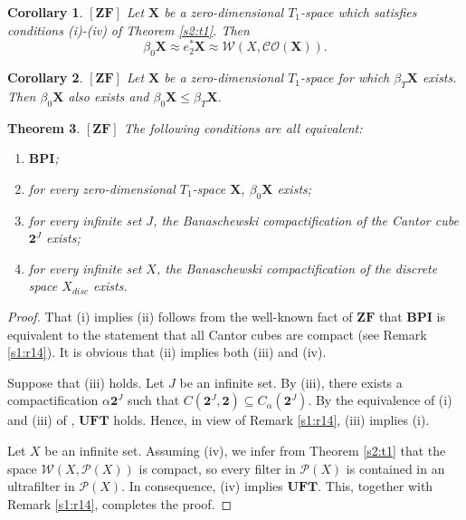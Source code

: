 \documentclass[12pt,twoside,leqno]{article}
\theoremstyle{plain}
\newtheorem{theorem}{Theorem}[section]
\newtheorem{corollary}[theorem]{Corollary}
\theoremstyle{definition}
\theoremstyle{remark}
\begin{document}
\begin{corollary}
	\label{s2:c2}
	$[\mathbf{ZF}]$ Let $\mathbf{X}$ be a zero-dimensional $T_1$-space which satisfies conditions (i)-(iv) of Theorem \ref{s2:t1}. Then
	$$\beta_0\mathbf{X}\approx e^{\ast}_{2}\mathbf{X}\approx\mathcal{W}(X, \mathcal{CO}(\mathbf{X})).$$
\end{corollary}

\begin{corollary}
	\label{s2:c3}
	$[\mathbf{ZF}]$ Let $\mathbf{X}$ be a zero-dimensional $T_1$-space for which $\beta_T\mathbf{X}$ exists. Then $\beta_0\mathbf{X}$ also exists and $\beta_0\mathbf{X}\leq\beta_{T}\mathbf{X}$.
\end{corollary}

\begin{theorem}
	\label{s2:t4}
	$[\mathbf{ZF}]$ The following conditions are all equivalent:
	\begin{enumerate}
		\item[(i)] $\mathbf{BPI}$;
		\item[(ii)] for every zero-dimensional $T_1$-space $\mathbf{X}$, $\beta_0\mathbf{X}$ exists;
		\item[(iii)] for every infinite set $J$, the Banaschewski compactification of the Cantor cube $\mathbf{2}^J$ exists;
		\item[(iv)] for every infinite set $X$, the Banaschewski compactification of the discrete space $X_{disc}$ exists.
	\end{enumerate}
\end{theorem}
\begin{proof}
	That (i) implies (ii) follows from the well-known fact of $\mathbf{ZF}$ that $\mathbf{BPI}$ is equivalent to the statement that all Cantor cubes are compact (see Remark \ref{s1:r14}). It is obvious that (ii) implies both (iii) and (iv). 
	
	Suppose that (iii) holds. Let $J$ be an infinite set. By (iii), there exists a compactification $\alpha \mathbf{2}^J$ such that $C(\mathbf{2}^J, \mathbf{2})\subseteq C_{\alpha}(\mathbf{2}^J)$. By the equivalence of (i) and (iii) of \cite[Theorem 3.16]{kw1}, $\mathbf{UFT}$ holds. Hence, in view of Remark \ref{s1:r14}, (iii) implies (i).
	
	Let $X$ be an infinite set. Assuming (iv), we infer from Theorem \ref{s2:t1} that the space $\mathcal{W}(X, \mathcal{P}(X))$ is compact, so every filter in $\mathcal{P}(X)$ is contained in an ultrafilter in $\mathcal{P}(X)$. In consequence, (iv) implies $\mathbf{UFT}$. This, together with Remark \ref{s1:r14}, completes the proof.
\end{proof}
\end{document}
